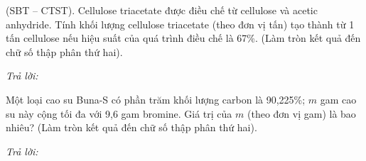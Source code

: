 \documentclass[11pt,a4paper]{article}
\def\loigiai#1{}
\begin{document}
\begin{ex}
(SBT -- CTST). Cellulose triacetate được điều chế từ cellulose và acetic anhydride. Tính khối lượng cellulose triacetate (theo đơn vị tấn) tạo thành từ 1 tấn cellulose nếu hiệu suất của quá trình điều chế là 67\%. (Làm tròn kết quả đến chữ số thập phân thứ hai).
\par\noindent\textit{Trả lời:} \dotfill
\loigiai{}
\end{ex}

\begin{ex}
Một loại cao su Buna-S có phần trăm khối lượng carbon là 90,225\%; $m$ gam cao su này cộng tối đa với 9,6 gam bromine. Giá trị của $m$ (theo đơn vị gam) là bao nhiêu? (Làm tròn kết quả đến chữ số thập phân thứ hai).
\par\noindent\textit{Trả lời:} \dotfill
\loigiai{}
\end{ex}


\end{document}
